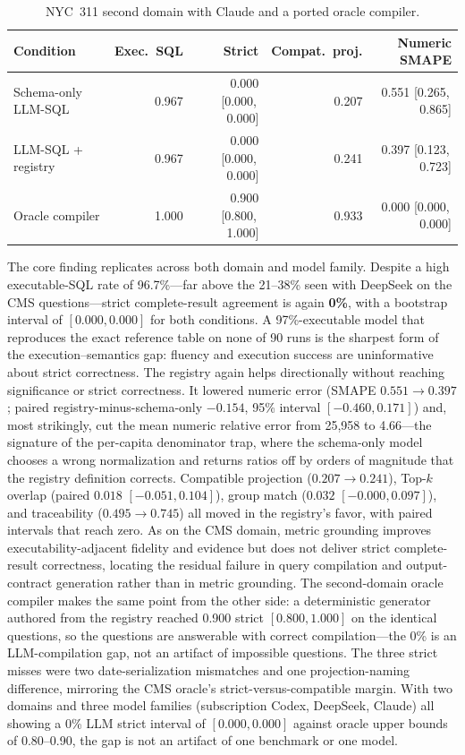 \documentclass[11pt]{article}
\newcommand{\ci}[2]{[#1,\,#2]}
\begin{document}
\begin{table}[h]
\centering\small
\begin{tabular}{lrrrr}
\toprule
Condition & Exec.\ SQL & Strict & Compat.\ proj. & Numeric SMAPE \\
\midrule
Schema-only LLM-SQL & 0.967 & 0.000 \ci{0.000}{0.000} & 0.207 & 0.551 \ci{0.265}{0.865} \\
LLM-SQL + registry & 0.967 & 0.000 \ci{0.000}{0.000} & 0.241 & 0.397 \ci{0.123}{0.723} \\
Oracle compiler & 1.000 & 0.900 \ci{0.800}{1.000} & 0.933 & 0.000 \ci{0.000}{0.000} \\
\bottomrule
\end{tabular}
\caption{NYC~311 second domain with Claude and a ported oracle compiler.}
\label{tab:nyc}
\end{table}

The core finding replicates across both domain and model family. Despite a high
executable-SQL rate of 96.7\%---far above the 21--38\% seen with DeepSeek on the
CMS questions---strict complete-result agreement is again \textbf{0\%}, with a
bootstrap interval of $[0.000, 0.000]$ for both conditions. A 97\%-executable
model that reproduces the exact reference table on none of 90 runs is the sharpest
form of the execution--semantics gap: fluency and execution success are
uninformative about strict correctness. The registry again helps directionally
without reaching significance or strict correctness. It lowered numeric error
(SMAPE $0.551 \rightarrow 0.397$; paired registry-minus-schema-only $-0.154$, 95\%
interval $[-0.460, 0.171]$) and, most strikingly, cut the mean numeric relative
error from 25,958 to 4.66---the signature of the per-capita denominator trap,
where the schema-only model chooses a wrong normalization and returns ratios off
by orders of magnitude that the registry definition corrects. Compatible
projection ($0.207 \rightarrow 0.241$), Top-$k$ overlap (paired $0.018$
$[-0.051, 0.104]$), group match ($0.032$ $[-0.000, 0.097]$), and traceability
($0.495 \rightarrow 0.745$) all moved in the registry's favor, with paired
intervals that reach zero. As on the CMS domain, metric grounding improves
executability-adjacent fidelity and evidence but does not deliver strict
complete-result correctness, locating the residual failure in query compilation
and output-contract generation rather than in metric grounding. The second-domain
oracle compiler makes the same point from the other side: a deterministic
generator authored from the registry reached 0.900 strict $[0.800, 1.000]$ on the
identical questions, so the questions are answerable with correct compilation---the
0\% is an LLM-compilation gap, not an artifact of impossible questions. The three
strict misses were two date-serialization mismatches and one projection-naming
difference, mirroring the CMS oracle's strict-versus-compatible margin. With two
domains and three model families (subscription Codex, DeepSeek, Claude) all
showing a 0\% LLM strict interval of $[0.000, 0.000]$ against oracle upper bounds
of 0.80--0.90, the gap is not an artifact of one benchmark or one model.
\end{document}

